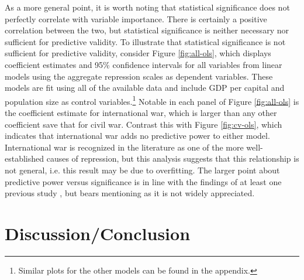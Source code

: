 \documentclass[11pt]{article}
\begin{document}
As a more general point, it is worth noting that statistical significance does not perfectly correlate with variable importance. There is certainly a positive correlation between the two, but statistical significance is neither necessary nor sufficient for predictive validity. To illustrate that statistical significance is not sufficient for predictive validity, consider Figure \ref{fig:all-ols}, which displays coefficient estimates and 95\% confidence intervals for all variables from linear models using the aggregate repression scales as dependent variables. These models are fit using all of the available data and include GDP per capital and population size as control variables.\footnote{Similar plots for the other models can be found in the appendix.}  Notable in each panel of Figure \ref{fig:all-ols} is the coefficient estimate for international war, which is larger than any other coefficient save that for civil war. Contrast this with Figure \ref{fig:cv-ols}, which indicates that international war adds no predictive power to either model. International war is recognized in the literature as one of the more well-established causes of repression, but this analysis suggests that this relationship is not general, i.e. this result may be due to overfitting. The larger point about predictive power versus significance is in line with the findings of at least one previous study \citep{Wardetal2010}, but bears mentioning as it is not widely appreciated.

\section{Discussion/Conclusion}
\end{document}
